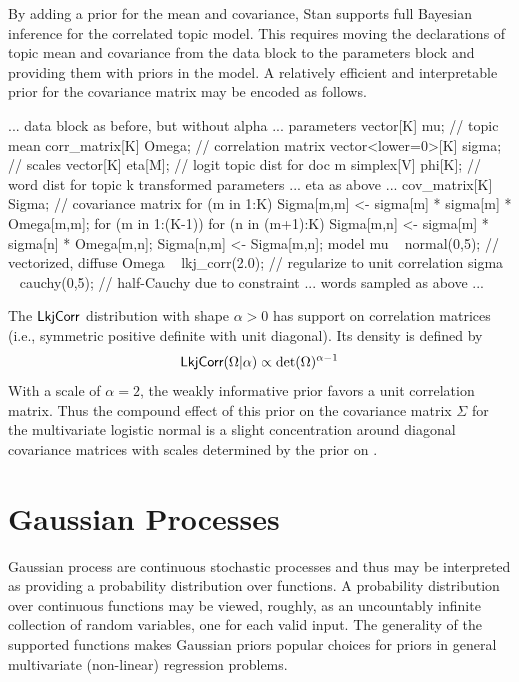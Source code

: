 By adding a prior for the mean and covariance, Stan supports full
Bayesian inference for the correlated topic model.  This requires
moving the declarations of topic mean  and covariance  
from the data block to the parameters block and providing them with
priors in the model.  A relatively efficient and interpretable prior
for the covariance matrix  may be encoded as follows.
%
\begin{stancode}
... data block as before, but without alpha ...
parameters {
  vector[K] mu;              // topic mean
  corr_matrix[K] Omega;      // correlation matrix
  vector<lower=0>[K] sigma;  // scales
  vector[K] eta[M];          // logit topic dist for doc m
  simplex[V] phi[K];         // word dist for topic k
}
transformed parameters {
  ... eta as above ...
  cov_matrix[K] Sigma;       // covariance matrix
  for (m in 1:K)
    Sigma[m,m] <- sigma[m] * sigma[m] * Omega[m,m];
  for (m in 1:(K-1)) {
    for (n in (m+1):K) {
      Sigma[m,n] <- sigma[m] * sigma[n] * Omega[m,n];
      Sigma[n,m] <- Sigma[m,n];
    }
  }
}
model {
  mu ~ normal(0,5);       // vectorized, diffuse
  Omega ~ lkj_corr(2.0);  // regularize to unit correlation
  sigma ~ cauchy(0,5);    // half-Cauchy due to constraint
  ... words sampled as above ...
}
\end{stancode}
%
The $\distro{LkjCorr}$ distribution with shape $\alpha > 0$ has support
on correlation matrices (i.e., symmetric positive definite with unit
diagonal).  Its density is defined by
\[
\distro{LkjCorr}(\Omega|\alpha) \propto \mbox{det}(\Omega)^{\alpha - 1}
\]
With a scale of $\alpha = 2$, the weakly informative prior favors a
unit correlation matrix.  Thus the compound effect of this prior on
the covariance matrix $\Sigma$ for the multivariate logistic normal is
a slight concentration around diagonal covariance matrices with scales
determined by the prior on .






\chapter{Gaussian Processes}\label{gaussian-processes.chapter}

\noindent
Gaussian process are continuous stochastic processes and thus may be
interpreted as providing a probability distribution over functions.  A
probability distribution over continuous functions may be viewed,
roughly, as an uncountably infinite collection of random variables,
one for each valid input.  The generality of the supported functions
makes Gaussian priors popular choices for priors in general
multivariate (non-linear) regression problems.

